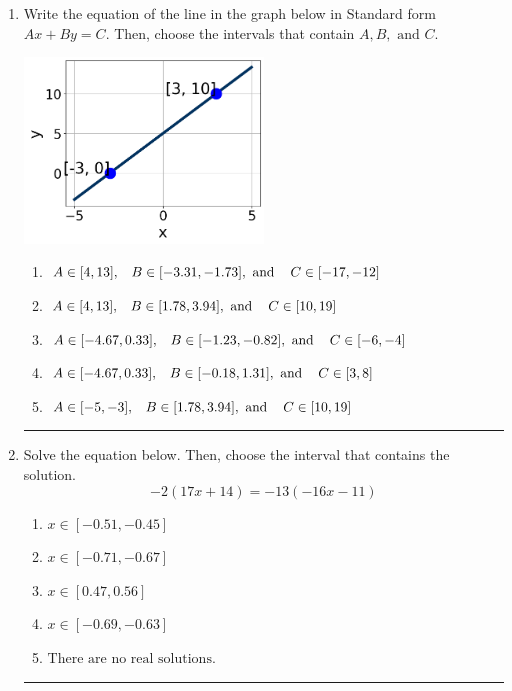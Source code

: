 \documentclass[14pt]{extbook}
\newcommand{\litem}[1]{\item#1\hspace*{-1cm}\rule{\textwidth}{0.4pt}}
\begin{document}
\begin{enumerate}
{\begin{enumerate}[label=\Alph*.]
\end{enumerate} }
\litem{
Write the equation of the line in the graph below in Standard form $Ax+By=C$. Then, choose the intervals that contain $A, B, \text{ and } C$.
\begin{center}
    \includegraphics[width=0.5\textwidth]{../Figures/linearGraphToStandardCopyA.png}
\end{center}
\begin{enumerate}[label=\Alph*.]
\item \( A \in [4, 13], \hspace{3mm} B \in [-3.31, -1.73], \text{ and } \hspace{3mm} C \in [-17, -12] \)
\item \( A \in [4, 13], \hspace{3mm} B \in [1.78, 3.94], \text{ and } \hspace{3mm} C \in [10, 19] \)
\item \( A \in [-4.67, 0.33], \hspace{3mm} B \in [-1.23, -0.82], \text{ and } \hspace{3mm} C \in [-6, -4] \)
\item \( A \in [-4.67, 0.33], \hspace{3mm} B \in [-0.18, 1.31], \text{ and } \hspace{3mm} C \in [3, 8] \)
\item \( A \in [-5, -3], \hspace{3mm} B \in [1.78, 3.94], \text{ and } \hspace{3mm} C \in [10, 19] \)

\end{enumerate} }
\litem{
Solve the equation below. Then, choose the interval that contains the solution.\[ -2(17x + 14) = -13(-16x -11) \]\begin{enumerate}[label=\Alph*.]
\item \( x \in [-0.51, -0.45] \)
\item \( x \in [-0.71, -0.67] \)
\item \( x \in [0.47, 0.56] \)
\item \( x \in [-0.69, -0.63] \)
\item \( \text{There are no real solutions.} \)


\end{enumerate}}
\end{enumerate}
\end{document}
